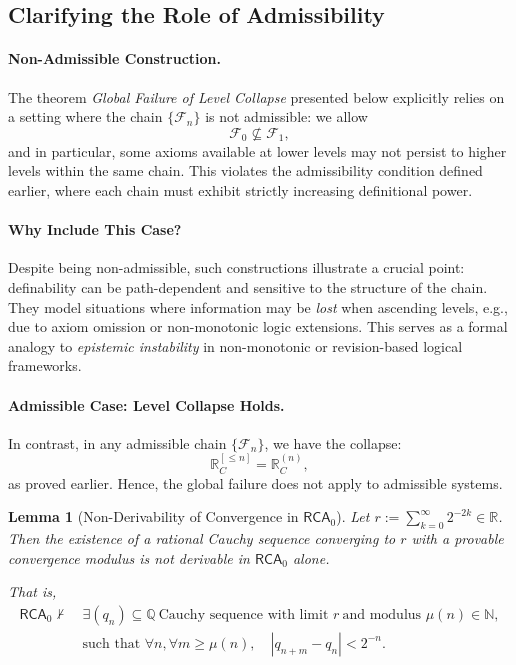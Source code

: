 \documentclass[12pt]{article}
\theoremstyle{definition}
\theoremstyle{plain}
\newtheorem{lemma}[definition]{Lemma}
\theoremstyle{remark}
\begin{document}
\subsection*{Clarifying the Role of Admissibility}

\paragraph{Non-Admissible Construction.}
The theorem \emph{Global Failure of Level Collapse} presented below explicitly relies on a setting where the chain \( \{ \mathcal{F}_n \} \) is not admissible: we allow
\[
\mathcal{F}_0 \not\subseteq \mathcal{F}_1,
\]
and in particular, some axioms available at lower levels may not persist to higher levels within the same chain. This violates the admissibility condition defined earlier, where each chain must exhibit strictly increasing definitional power.

\paragraph{Why Include This Case?}
Despite being non-admissible, such constructions illustrate a crucial point: definability can be path-dependent and sensitive to the structure of the chain. They model situations where information may be \emph{lost} when ascending levels, e.g., due to axiom omission or non-monotonic logic extensions. This serves as a formal analogy to \emph{epistemic instability} in non-monotonic or revision-based logical frameworks.

\paragraph{Admissible Case: Level Collapse Holds.}
In contrast, in any admissible chain \( \{ \mathcal{F}_n \} \), we have the collapse:
\[
\mathbb{R}_C^{[\leq n]} = \mathbb{R}_C^{(n)},
\]
as proved earlier. Hence, the global failure does not apply to admissible systems.

\begin{lemma}[Non-Derivability of Convergence in \( \mathsf{RCA}_0 \)]
\label{lemma:RCA0-incompleteness}
Let \( r := \sum_{k=0}^\infty 2^{-2k} \in \mathbb{R} \). Then the existence of a rational Cauchy sequence converging to \( r \) with a provable convergence modulus is not derivable in \( \mathsf{RCA}_0 \) alone.

That is,
\begin{align*}
    \mathsf{RCA}_0 \nvdash\ &\exists (q_n) \subseteq \mathbb{Q} \ \text{Cauchy sequence with limit } r \ \text{and modulus } \mu(n) \in \mathbb{N}, \\
    &\text{such that } \forall n, \forall m \geq \mu(n), \quad |q_{n+m} - q_n| < 2^{-n}.
\end{align*}
\end{lemma}
\end{document}
